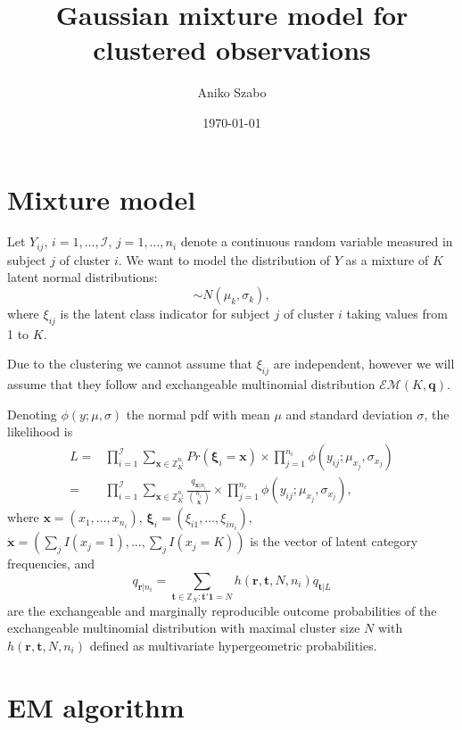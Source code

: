 \documentclass[reqno]{amsart}
\title{Gaussian mixture model for clustered observations}
\author{Aniko Szabo}
\date{\today}
\newcommand{\vv}[1]{\boldsymbol{#1}}
\newcommand{\ff}[1]{\dot{#1}}
\newcommand{\Z}[2][K]{\mathbb{Z}_{#1}^{#2}}
\newcommand{\I}{\mathcal{I}}
\newcommand{\EM}{\mathcal{EM}}
\begin{document}
\maketitle

\section{Mixture model}
Let $Y_{ij}$, $i=1,\ldots,\I$, $j=1,\ldots,n_i$ denote a continuous random variable 
measured in subject $j$ of cluster $i$. We want to model the distribution of $Y$
as a mixture of $K$ latent normal distributions:
\begin{equation}
[Y_{ij} \mid \xi_{ij}=k] \sim N(\mu_k, \sigma_k),
\end{equation}
where $\xi_{ij}$ is the latent class indicator for subject $j$ of cluster $i$
taking values from 1 to $K$.

Due to the clustering we cannot assume that $\xi_{ij}$ are independent, however we
will assume that they follow and exchangeable multinomial distribution $\EM(K,\vv{q})$.

Denoting $\phi(y; \mu, \sigma)$  the normal pdf with mean $\mu$ and standard deviation 
$\sigma$, the likelihood is
\begin{align}
L = & \prod_{i=1}^\I \sum_{\vv{x}\in \Z{n_i}} Pr(\vv{\xi}_{i}=\vv{x})
\times \prod_{j=1}^{n_i} \phi(y_{ij}; \mu_{x_j}, \sigma_{x_j})\\
 = &  \prod_{i=1}^\I \sum_{\vv{x}\in \Z{n_i}} \frac{q_{\ff{\vv{x}}|n_i}}{\binom{n_i}{\ff{\vv{x}}}} 
\times \prod_{j=1}^{n_i} \phi(y_{ij}; \mu_{x_j}, \sigma_{x_j}),
\end{align}
where $\vv{x} = (x_1,\ldots,x_{n_i})$, $\vv{\xi}_{i}=(\xi_{i1},\ldots,\xi_{in_i})$, 
$\ff{\vv{x}} = (\sum_j I(x_j=1),\ldots,\sum_j I(x_j=K))$ is the vector of latent category 
frequencies, and
\begin{equation}
q_{\vv{r}|n_i} = \sum_{\vv{t}\in\mathbb{Z}_N: \vv{t}'\vv{1}=N} h(\vv{r}, \vv{t}, N, n_i) q_{\vv{t}|L}
\end{equation}
are the exchangeable and marginally reproducible outcome probabilities of the 
exchangeable multinomial distribution with maximal cluster size $N$ with 
$h(\vv{r}, \vv{t}, N, n_i)$ defined as multivariate hypergeometric probabilities.



\section{EM algorithm}
\end{document}
